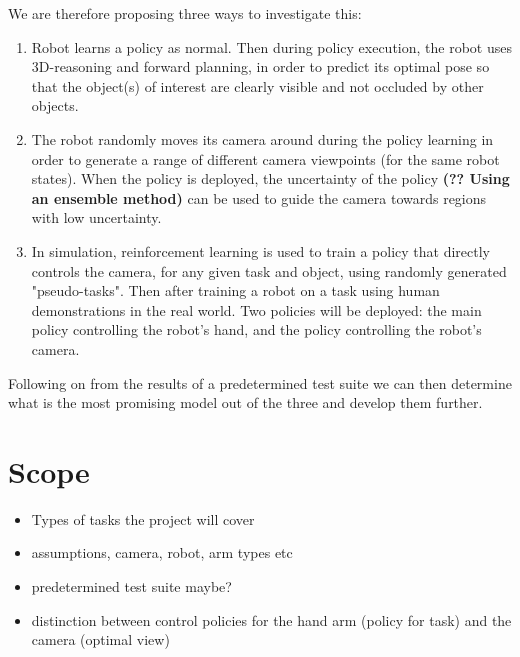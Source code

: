     We are therefore proposing three ways to investigate this:
    \begin{enumerate}
      \item Robot learns a policy as normal. Then during policy execution, the robot uses 3D-reasoning and forward planning, in order to predict its optimal pose so that the object(s) of interest are clearly visible and not occluded by other objects.
      \item The robot randomly moves its camera around during the policy learning in order to generate a range of different camera viewpoints (for the same robot states). When the policy is deployed, the uncertainty of the policy \textbf{(?? Using an ensemble method)} can be used to guide the camera towards regions with low uncertainty.
      \item In simulation, reinforcement learning is used to train a policy that directly controls the camera, for any given task and object, using randomly generated "pseudo-tasks". Then after training a robot on a task using human demonstrations in the real world. Two policies will be deployed: the main policy controlling the robot's hand, and the policy controlling the robot's camera.
\end{enumerate}

Following on from the results of a predetermined test suite we can then determine what is the most promising model out of the three and develop them further.
\section{Scope}

\begin{itemize}
	\item Types of tasks the project will cover
	\item assumptions, camera, robot, arm types etc
	\item predetermined test suite maybe?
	\item distinction between control policies for the hand arm (policy for task) and the camera (optimal view)
\end{itemize}

